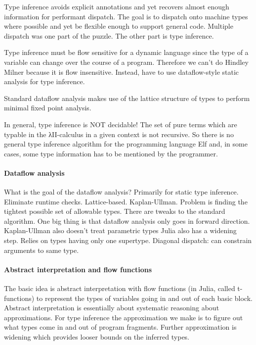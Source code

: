 \documentclass[pldi]{sigplanconf-pldi15}
\begin{document}

Type inference avoids explicit annotations and yet recovers almost enough information for performant dispatch. The goal is to dispatch onto machine types where possible and yet be flexible enough to support general code. Multiple dispatch was one part of the puzzle. The other part is type inference.

Type inference must be flow sensitive for a dynamic language since the type of a variable can change over the course of a program. Therefore we can't do Hindley Milner because it is flow insensitive. Instead, have to use dataflow-style static analysis for type inference.

Standard dataflow analysis makes use of the lattice structure of types to perform minimal fixed point analysis.

In general, type inference is NOT decidable! The set of pure terms which are typable in the λII-calculus in a given context is not recursive. So there is no general type inference algorithm for the programming language Elf and, in some cases, some type information has to be mentioned by the programmer. 

\paragraph{Dataflow analysis}
What is the goal of the dataflow analysis? Primarily for static type inference. Eliminate runtime checks. Lattice-based. Kaplan-Ullman.
Problem is finding the tightest possible set of allowable types.
There are tweaks to the standard algorithm. One big thing is that dataflow analysis only goes in forward direction.
Kaplan-Ullman also doesn't treat parametric types
Julia also has a widening step.
Relies on types having only one supertype.
Diagonal dispatch: can constrain arguments to same type.






\paragraph{Abstract interpretation and flow functions}
The basic idea is abstract interpretation with flow functions (in Julia, called
t-functions) to represent the types of variables going in and out of each basic
block.  Abstract interpretation is essentially about systematic reasoning about
approximations. For type inference the approximation we make is to figure out
what types come in and out of program fragments. Further approximation is
widening which provides looser bounds on the inferred types. 
\end{document}
